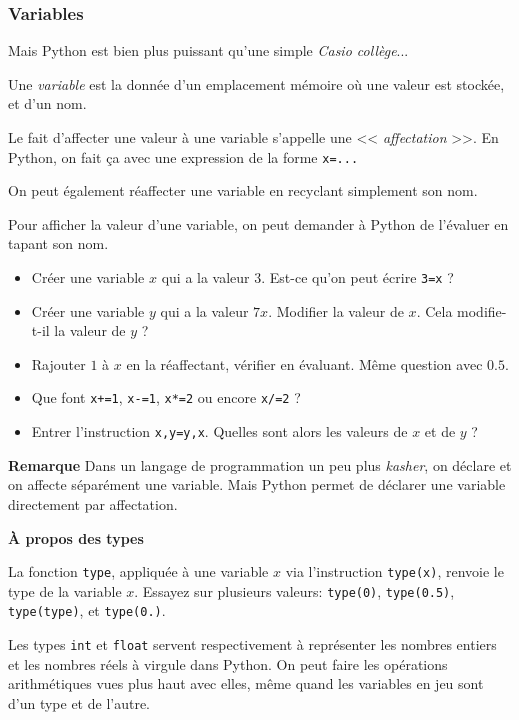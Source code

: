 \begin{frame}[fragile]
\frametitle{Variables}

Mais Python est bien plus puissant qu'une simple \textit{Casio collège}...
\pause

Une \textit{variable} est la donnée d'un emplacement mémoire où une valeur est stockée, et d'un nom.
\pause

Le fait d'affecter une valeur à une variable s'appelle une << \textit{affectation} >>. En Python, on fait ça avec une expression de la forme \lstinline|x=...|	
\pause

On peut également réaffecter une variable en recyclant simplement son nom.
\pause

Pour afficher la valeur d'une variable, on peut demander à Python de l'évaluer en tapant son nom.
\pause
	\begin{exo}
		
		\begin{itemize}[<+->]
		\item Créer une variable $x$ qui a la valeur $3$. Est-ce qu'on peut écrire \lstinline|3=x| ?
		
		\item Créer une variable $y$ qui a la valeur $7x$. Modifier la valeur de $x$. Cela modifie-t-il la valeur de $y$ ?
		
		\item Rajouter $1$ à $x$ en la réaffectant, vérifier en évaluant. Même question avec $0.5$.
		
		\item Que font \lstinline|x+=1|, \lstinline|x-=1|, \lstinline|x*=2| ou encore \lstinline|x/=2| ?
		
		\item Entrer l'instruction \lstinline|x,y=y,x|. Quelles sont alors les valeurs de $x$ et de $y$ ?
		\end{itemize}
		\pause[8]
	\end{exo}
\end{frame}

\begin{frame}[fragile]
	\textbf{Remarque} Dans un langage de programmation un peu plus \textit{kasher}, on déclare et on affecte séparément une variable. Mais Python permet de déclarer une variable directement par affectation.
	\pause
	
	\vspace{1em}
	\textbf{À propos des types}
	
	La fonction \lstinline|type|, appliquée à une variable $x$ via l'instruction \lstinline|type(x)|, renvoie le type de la variable $x$. Essayez sur plusieurs valeurs: \lstinline|type(0)|, \lstinline|type(0.5)|, \lstinline|type(type)|, et \lstinline|type(0.)|.
	\pause
	
	Les types \lstinline|int| et \lstinline|float| servent respectivement à représenter les nombres entiers et les nombres réels à virgule dans Python. On peut faire les opérations arithmétiques vues plus haut avec elles, même quand les variables en jeu sont d'un type et de l'autre.
	
\end{frame}

